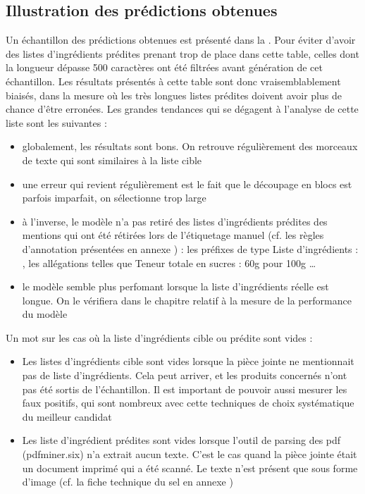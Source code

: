         \subsection{Illustration des prédictions obtenues}
        \label{prediction_gt_illustration}
        Un échantillon des prédictions obtenues est présenté dans la .
        Pour éviter d'avoir des listes d'ingrédients prédites prenant trop de place dans cette table, celles dont la longueur dépasse 500 caractères ont été filtrées avant génération de cet échantillon.
        Les résultats présentés à cette table sont donc vraisemblablement biaisés, dans la mesure où les très longues listes prédites doivent avoir plus de chance d'être erronées.
        Les grandes tendances qui se dégagent à l'analyse de cette liste sont les suivantes : 
        \begin{itemize}
            \item globalement, les résultats sont bons. On retrouve régulièrement des morceaux de texte qui sont similaires à la liste cible
            \item une erreur qui revient régulièrement est le fait que le découpage en blocs est parfois imparfait, on sélectionne \og trop large \fg
            \item à l'inverse, le modèle n'a pas retiré des listes d'ingrédients prédites des mentions qui ont été rétirées lors de l'étiquetage manuel (cf. les règles d'annotation présentées en annexe ) : les préfixes de type \og Liste d'ingrédients : \fg, les allégations telles que \og Teneur totale en sucres : 60g pour 100g \fg \dots
            \item le modèle semble plus perfomant lorsque la liste d'ingrédients réelle est longue. On le vérifiera dans le chapitre relatif à la mesure de la performance du modèle
        \end{itemize}
        Un mot sur les cas où la liste d'ingrédients cible ou prédite sont vides :
        \begin{itemize}
            \item Les listes d'ingrédients cible sont vides lorsque la pièce jointe ne mentionnait pas de liste d'ingrédients. Cela peut arriver, et les produits concernés n'ont pas été sortis de l'échantillon. Il est important de pouvoir aussi mesurer les faux positifs, qui sont nombreux avec cette techniques de choix systématique du meilleur candidat
            \item Les liste d'ingrédient prédites sont vides lorsque l'outil de parsing des pdf (pdfminer.six) n'a extrait aucun texte. C'est le cas quand la pièce jointe était un document imprimé qui a été scanné. Le texte n'est présent que sous forme d'image (cf. la fiche technique du sel en annexe )
        \end{itemize}

